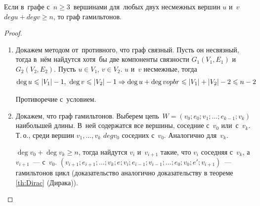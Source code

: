 \begin{theorem}[Оре]
	Если в~графе с~$n \geqslant 3$~вершинами для~любых двух несмежных вершин $u$ и~$v$ $deg u + deg v \geqslant n$, то граф гамильтонов.
\end{theorem}
\begin{proof}
\begin{enumerate}
	\item Докажем методом от~противного, что граф связный.
	Пусть он несвязный, тогда в~нём найдутся хотя~бы две компоненты связности $G_1(V_1, E_1)$ и~$G_2(V_2, E_2)$.
	Пусть $u \in V_1$, $v \in V_2$. $u$ и~$v$ несмежные, тогда
	\begin{equation*}
	\deg u \leqslant |V_1| - 1, \ \deg v \leqslant |V_2| - 1 \opbr\Rightarrow \deg u + \deg v opbr\leqslant |V_1| + |V_2| - 2 \opbr\leqslant n - 2
	\end{equation*}
	
	Противоречие с~условием.
	
	\item Докажем, что граф гамильтонов.
	Выберем цепь~$W = (v_0; e_0; v_1; \ldots; e_{k-1}; v_k)$ наибольшей длины.
	В~ней содержатся все вершины, соседние с~$v_0$ или~с~$v_k$.
	Т.\,о., среди вершин $v_1, \ldots, v_k$ $deg v_0$ соседних с~$v_0$.
	Аналогично для~$v_k$.
	
	$\deg v_0 + \deg v_k \geqslant n$, тогда найдутся $v_i$ и~$v_{i+1}$ такие, что $v_i$ соседняя с~$v_k$, а $v_{i+1}$~--- с~$v_0$.\newline
	$(v_{i+1}; e_{i+1}; \ldots; v_k; e; v_i; e_{i-1}; v_{i-1}; \ldots; e_0; v_0; e'; v_{i+1})$~--- гамильтонов цикл (доказательство аналогично доказательству в теореме \ref{th:Dirac} (Дирака)).
\end{enumerate}
\end{proof}